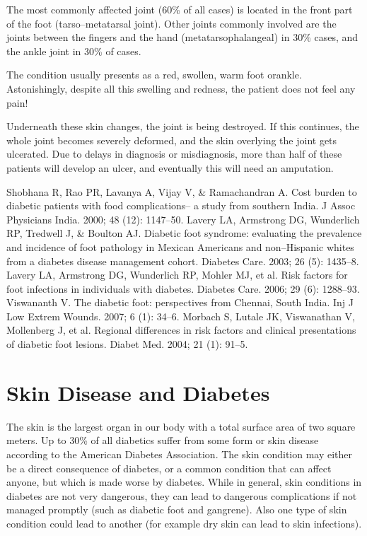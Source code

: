 The most commonly affected joint (60\% of all cases) is located in the front part of the foot (tarso–metatarsal joint). Other joints commonly involved are the joints between the fingers and the hand (metata\-rso\-pha\-la\-ngeal) in 30\% cases, and the ankle joint in 30\% of cases.

The condition usually presents as a red, swollen, warm foot or\break ankle. Astonishingly, despite all this swelling and redness, the patient does not feel any pain!

Underneath these skin changes, the joint is being destroyed. If this continues, the whole joint becomes severely deformed, and the skin overlying the joint gets ulcerated. Due to delays in diagnosis or misdiagnosis, more than half of these patients will develop an ulcer, and eventually this will need an amputation.

\begin{thebibliography}{99}
 Shobhana R, Rao PR, Lavanya A, Vijay V, \& Ramachandran A. Cost burden to diabetic patients with food complications– a study from southern India. J Assoc Physicians India. 2000; 48 (12): 1147–50.
 Lavery LA, Armstrong DG, Wunderlich RP, Tredwell J, \& Boulton AJ. Diabetic foot syndrome: evaluating the prevalence and incidence of foot pathology in Mexican Americans and non–Hispanic whites from a diabetes disease management cohort. Diabetes Care. 2003; 26 (5): 1435–8.
 Lavery LA, Armstrong DG, Wunderlich RP, Mohler MJ, et al. Risk factors for foot infections in individuals with diabetes. Diabetes Care. 2006; 29 (6): 1288–93.
 Viswananth V. The diabetic foot: perspectives from Chennai, South India. Inj J Low Extrem Wounds. 2007; 6 (1): 34–6.
 Morbach S, Lutale JK, Viswanathan V, Mollenberg J, et al. Regional differences in risk factors and clinical presentations of diabetic foot lesions. Diabet Med. 2004; 21 (1): 91–5.
\end{thebibliography}

\newpage
 
\renewcommand{\thechapter}{\arabic{chapter}A}
\chapter{Skin Disease and Diabetes}\label{chap18A}

The skin is the largest organ in our body with a total surface area of two square meters. Up to 30\% of all diabetics suffer from some form or skin disease according to the American Diabetes Association. The skin condition may either be a direct consequence of diabetes, or a common condition that can affect anyone, but which is made worse by diabetes. While in general, skin conditions in diabetes are not very dangerous, they can lead to dangerous complications if not managed promptly (such as diabetic foot and gangrene). Also one type of skin condition could lead to another (for example dry skin can lead to skin infections).

